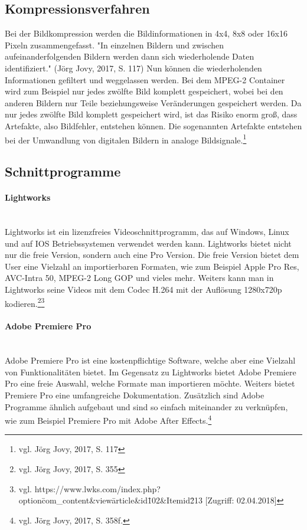 \subsection{Kompressionsverfahren}
Bei der Bildkompression werden die Bildinformationen in 4x4, 8x8 oder 16x16 Pixeln zusammengefasst. "In einzelnen Bildern und zwischen aufeinanderfolgenden Bildern werden dann sich wiederholende Daten identifiziert." (Jörg Jovy, 2017, S. 117)\newline
Nun können die wiederholenden Informationen gefiltert und weggelassen werden. Bei dem MPEG-2 Container wird zum Beispiel nur jedes zwölfte Bild komplett gespeichert, wobei bei den anderen Bildern nur Teile beziehungsweise Veränderungen gespeichert werden. Da nur jedes zwölfte Bild komplett gespeichert wird, ist das Risiko enorm groß, dass Artefakte, also Bildfehler, entstehen können. Die sogenannten Artefakte entstehen bei der Umwandlung von digitalen Bildern in analoge Bildsignale.\footnote{vgl. Jörg Jovy, 2017, S. 117}
\subsection{Schnittprogramme}
\paragraph{Lightworks}
\leavevmode \\
Lightworks ist ein lizenzfreies Videoschnittprogramm, das auf Windows, Linux und auf IOS Betriebssystemen verwendet werden kann. Lightworks bietet nicht nur die freie Version, sondern auch eine Pro Version. Die freie Version bietet dem User eine Vielzahl an importierbaren Formaten, wie zum Beispiel Apple Pro Res, AVC-Intra 50, MPEG-2 Long GOP und vieles mehr. Weiters kann man in Lightworks seine Videos mit dem Codec H.264 mit der Auflösung 1280x720p kodieren.\footnote{vgl. Jörg Jovy, 2017, S. 355}\footnote{vgl. https://www.lwks.com/index.php?option\=com\_content\&view\=article\&id\=102\&Itemid\=213 [Zugriff: 02.04.2018]}
\paragraph{Adobe Premiere Pro}
\leavevmode \\
Adobe Premiere Pro ist eine kostenpflichtige Software, welche aber eine Vielzahl von Funktionalitäten bietet. Im Gegensatz zu Lightworks bietet Adobe Premiere Pro eine freie Auswahl, welche Formate man importieren möchte. Weiters bietet Premiere Pro eine umfangreiche Dokumentation. Zusätzlich sind Adobe Programme ähnlich aufgebaut und sind so einfach miteinander zu verknüpfen, wie zum Beispiel Premiere Pro mit Adobe After Effects.\footnote{vgl. Jörg Jovy, 2017, S. 358f.}
